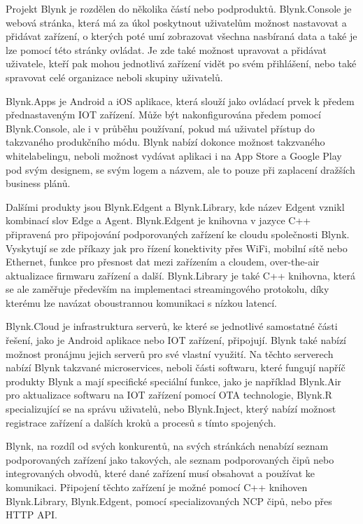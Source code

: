 Projekt Blynk je rozdělen do několika částí nebo podproduktů. Blynk.Console je webová stránka, která má za úkol poskytnout uživatelům možnost nastavovat a přidávat zařízení, o kterých poté umí zobrazovat všechna nasbíraná data a také je lze pomocí této stránky ovládat. Je zde také možnost upravovat a přidávat uživatele, kteří pak mohou jednotlivá zařízení vidět po svém přihlášení, nebo také spravovat celé organizace neboli skupiny uživatelů. 

Blynk.Apps je Android a iOS aplikace, která slouží jako ovládací prvek k předem přednastaveným IOT zařízení. Může být nakonfigurována předem pomocí Blynk.Console, ale i v průběhu používaní, pokud má uživatel přístup do takzvaného produkčního módu. Blynk nabízí dokonce možnost takzvaného whitelabelingu, neboli možnost vydávat aplikaci i na App Store a Google Play pod svým designem, se svým logem a názvem, ale to pouze při zaplacení dražších business plánů.

Dalšími produkty jsou Blynk.Edgent a Blynk.Library, kde název Edgent vznikl kombinací slov Edge a Agent. Blynk.Edgent je knihovna v jazyce C++ připravená pro připojování podporovaných zařízení ke cloudu společnosti Blynk. Vyskytují se zde příkazy jak pro řízení konektivity přes WiFi, mobilní sítě nebo Ethernet, funkce pro přesnost dat mezi zařízením a cloudem, over-the-air aktualizace firmwaru zařízení a další. Blynk.Library je také C++ knihovna, která se ale zaměřuje především na implementaci streamingového protokolu, díky kterému lze navázat oboustrannou komunikaci s nízkou latencí. 

Blynk.Cloud je infrastruktura serverů, ke které se jednotlivé samostatné části řešení, jako je Android aplikace nebo IOT zařízení, připojují. Blynk také nabízí možnost pronájmu jejich serverů pro své vlastní využití. Na těchto serverech nabízí Blynk takzvané microservices, neboli části softwaru, které fungují napříč produkty Blynk a mají specifické speciální funkce, jako je například Blynk.Air pro aktualizace softwaru na IOT zařízení pomocí OTA technologie, Blynk.R specializující se na správu uživatelů, nebo Blynk.Inject, který nabízí možnost registrace zařízení a dalších kroků a procesů s tímto spojených.

Blynk, na rozdíl od svých konkurentů, na svých stránkách nenabízí seznam podporovaných zařízení jako takových, ale seznam podporovaných čipů nebo integrovaných obvodů, které dané zařízení musí obsahovat a používat ke komunikaci. Připojení těchto zařízení je možné pomocí C++ knihoven Blynk.Library, Blynk.Edgent, pomocí specializovaných NCP čipů, nebo přes HTTP API.

